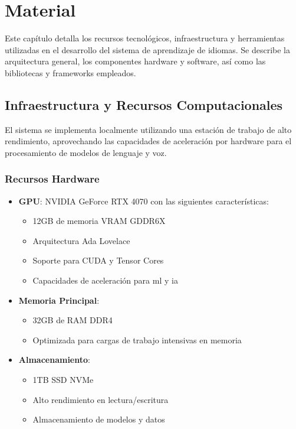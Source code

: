 \chapter{Material}
\label{material}

Este capítulo detalla los recursos tecnológicos, infraestructura y herramientas utilizadas en el desarrollo del sistema de aprendizaje de idiomas. Se describe la arquitectura general, los componentes hardware y software, así como las bibliotecas y frameworks empleados.

\section{Infraestructura y Recursos Computacionales}

El sistema se implementa localmente utilizando una estación de trabajo de alto rendimiento, aprovechando las capacidades de aceleración por hardware para el procesamiento de modelos de lenguaje y voz.

\subsection{Recursos Hardware}

\begin{itemize}
	\item \textbf{GPU}: NVIDIA GeForce RTX 4070 con las siguientes características:
	      \begin{itemize}
		      \item 12GB de memoria VRAM GDDR6X
		      \item Arquitectura Ada Lovelace
		      \item Soporte para CUDA y Tensor Cores
		      \item Capacidades de aceleración para \gls{ml} y \gls{ia}
	      \end{itemize}

	\item \textbf{Memoria Principal}:
	      \begin{itemize}
		      \item 32GB de RAM DDR4
		      \item Optimizada para cargas de trabajo intensivas en memoria
	      \end{itemize}

	\item \textbf{Almacenamiento}:
	      \begin{itemize}
		      \item 1TB SSD NVMe
		      \item Alto rendimiento en lectura/escritura
		      \item Almacenamiento de modelos y datos
	      \end{itemize}
\end{itemize}


